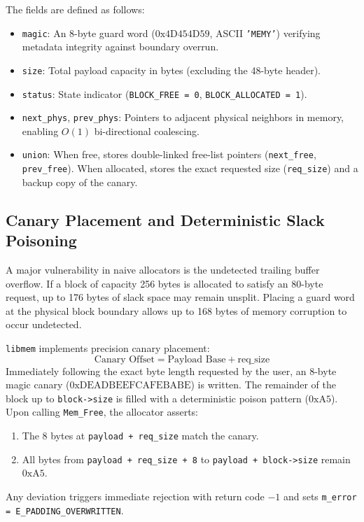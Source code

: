 \documentclass[11pt,a4paper]{article}
\begin{document}
The fields are defined as follows:
\begin{itemize}
    \item \texttt{magic}: An 8-byte guard word ($0\text{x4D454D59}$, ASCII \texttt{'MEMY'}) verifying metadata integrity against boundary overrun.
    \item \texttt{size}: Total payload capacity in bytes (excluding the 48-byte header).
    \item \texttt{status}: State indicator (\texttt{BLOCK\_FREE = 0}, \texttt{BLOCK\_ALLOCATED = 1}).
    \item \texttt{next\_phys}, \texttt{prev\_phys}: Pointers to adjacent physical neighbors in memory, enabling $O(1)$ bi-directional coalescing.
    \item \texttt{union}: When free, stores double-linked free-list pointers (\texttt{next\_free}, \texttt{prev\_free}). When allocated, stores the exact requested size (\texttt{req\_size}) and a backup copy of the canary.
\end{itemize}

\subsection{Canary Placement and Deterministic Slack Poisoning}
A major vulnerability in naive allocators is the undetected trailing buffer overflow. If a block of capacity 256 bytes is allocated to satisfy an 80-byte request, up to 176 bytes of slack space may remain unsplit. Placing a guard word at the physical block boundary allows up to 168 bytes of memory corruption to occur undetected.

\texttt{libmem} implements precision canary placement:
\begin{equation}
\text{Canary Offset} = \text{Payload Base} + \text{req\_size}
\end{equation}
Immediately following the exact byte length requested by the user, an 8-byte magic canary ($0\text{xDEADBEEFCAFEBABE}$) is written. The remainder of the block up to \texttt{block->size} is filled with a deterministic poison pattern ($0\text{xA5}$). Upon calling \texttt{Mem\_Free}, the allocator asserts:
\begin{enumerate}
    \item The 8 bytes at \texttt{payload + req\_size} match the canary.
    \item All bytes from \texttt{payload + req\_size + 8} to \texttt{payload + block->size} remain $0\text{xA5}$.
\end{enumerate}
Any deviation triggers immediate rejection with return code $-1$ and sets \texttt{m\_error = E\_PADDING\_OVERWRITTEN}.
\end{document}
